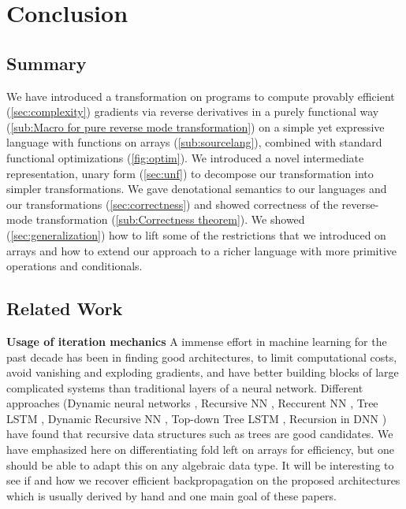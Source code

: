 \section{Conclusion}
\label{sec:conclusion}

\subsection{Summary} %
\label{sub:summary}

We have introduced a transformation on programs to compute provably efficient (\ref{sec:complexity}) 
gradients via reverse derivatives in a purely functional way (\ref{sub:Macro for pure reverse mode transformation})
on a simple yet expressive language with functions on arrays (\ref{sub:sourcelang}), 
combined with standard functional optimizations (\ref{fig:optim}).  
We introduced a novel intermediate representation, unary form (\ref{sec:unf}) 
to decompose our transformation into simpler transformations.
We gave denotational semantics to our languages and our transformations (\ref{sec:correctness}) 
and showed correctness of the reverse-mode transformation (\ref{sub:Correctness theorem}).
We showed (\ref{sec:generalization}) how to lift some of the restrictions that
we introduced on arrays and how to extend our approach to a richer language with more primitive operations and conditionals.

\subsection{Related Work} %
\label{sub:related_work}

\noindent \textbf{Usage of iteration mechanics}
A immense effort in machine learning for the past decade has been in finding
good architectures, to limit computational costs, 
avoid vanishing and exploding gradients, 
and have better building blocks of large complicated systems than traditional layers of a neural network.
Different approaches 
(Dynamic neural networks \cite{jin2017manipulability,wu2016deep}, 
Recursive NN \cite{socher2011parsing,biancofiore2017recursive}, 
Reccurent NN \cite{bahdanau2014neural,luong2015effective}, 
Tree LSTM \cite{tai2015improved,chen2016enhanced}, 
Dynamic Recursive NN \cite{guo2019dynamic}, 
Top-down Tree LSTM \cite{zhang2015top}, 
Recursion in DNN \cite{jeong2018improving}) 
have found that recursive data structures such as trees are good candidates.
We have emphasized here on differentiating fold left on arrays for efficiency, 
but one should be able to adapt this on any algebraic data type. 
It will be interesting to see if and how we recover efficient backpropagation on the proposed architectures 
which is usually derived by hand and one main goal of these papers.

